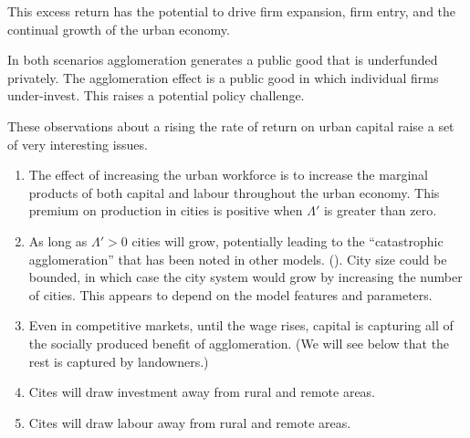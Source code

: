 This excess return has the potential to drive firm expansion, firm entry, and the continual growth of the urban economy. %



In both scenarios agglomeration generates a public good that is underfunded privately.
The agglomeration effect is a public good in which individual firms under-invest. This raises a potential policy challenge. %


These observations about a rising the rate of return on urban capital raise a set of very interesting issues.   
\begin{enumerate}
\item The effect of increasing the urban workforce is to increase the marginal products of  both capital and labour throughout the urban economy. This premium on production in cities is positive when $\Lambda'$ is greater than zero.
 \item  As long as $\Lambda'>0$ cities will  grow, potentially leading to the ``catastrophic agglomeration''  that has been noted in other models.  (\cite{FujitaKrugmanVenables, BaldwinMartin, Krugman1991, Gurwitz2019}).  City size could be bounded, in which case the city system would grow by increasing the number of cities. This appears to depend on the model features and parameters. 
 \item Even in competitive markets, until the wage rises, capital is capturing all of the socially produced benefit of agglomeration. (We will see below that the rest is captured by landowners.)

\item Cites will draw investment away from rural and remote areas.

\item Cites will draw labour away from rural and remote areas.
\end{enumerate}

